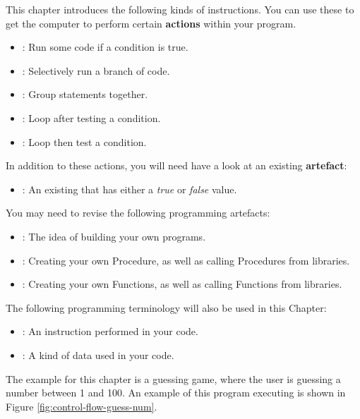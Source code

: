 This chapter introduces the following kinds of instructions. You can use these to get the computer to perform certain \textbf{actions} within your program.
\begin{itemize}
  \item {}: Run some code if a condition is true.
  \item {}: Selectively run a branch of code.
  \item {}: Group statements together.
  \item {}: Loop after testing a condition.
  \item {}: Loop then test a condition.
\end{itemize}

In addition to these actions, you will need have a look at an existing \textbf{artefact}:
\begin{itemize}
  \item {}: An existing  that has either a \emph{true} or \emph{false} value.
\end{itemize}

\bigskip

You may need to revise the following programming artefacts:
\begin{itemize}
  \item {}: The idea of building your own programs.
  \item {}: Creating your own Procedure, as well as calling Procedures from libraries.
  \item {}: Creating your own Functions, as well as calling Functions from libraries.
\end{itemize}

The following programming terminology will also be used in this Chapter:
\begin{itemize}
  \item {}: An instruction performed in your code.
  \item {}: A kind of data used in your code.
\end{itemize}

The example for this chapter is a guessing game, where the user is guessing a number between 1 and 100. An example of this program executing is shown in Figure \ref{fig:control-flow-guess-num}.

